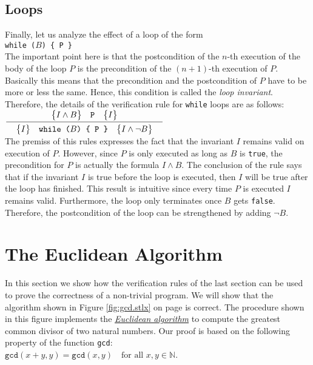 \subsection{Loops}
Finally, let us analyze the effect of a loop of the form
\\[0.2cm]
\hspace*{1.3cm}
\texttt{while ($B$) \{ P \}} 
\\[0.2cm]
The important point here is that the postcondition of the $n$-th
execution of the body of the loop $P$ is the precondition of the $(n\!+\!1)$-th
execution of $P$.  Basically this means that the precondition and the
postcondition of $P$ have to be more or less the same.
Hence, this condition is called the \emph{loop invariant}.  Therefore,
the details of the verification rule for \texttt{while} loops are as follows:
\\[0.2cm]
\hspace*{1.3cm}
$\bruch{\hoare{I \wedge B}{P}{I}}{\quad \hoare{I}{while ($B$) \{ P \}}{I \wedge \neg B}\quad}$
\\[0.2cm]
The premiss of this rules expresses the fact that the invariant $I$ remains valid on execution of $P$.
However, since $P$ is only executed as long as $B$ is \texttt{true}, the precondition for $P$ is actually 
the formula $I \wedge B$.  The conclusion of the rule says that if the invariant $I$ is true before
the loop is executed, then $I$ will be true after the loop has finished.  This result is intuitive
since every time $P$ is executed $I$ remains valid.  Furthermore, the loop only terminates once $B$
gets \texttt{false}.  Therefore, the postcondition of the loop can be strengthened by adding $\neg B$.



\section{The Euclidean  Algorithm}
In this section we show how the verification rules of the last section can be used to prove the
correctness of a non-trivial program.
We will show that the algorithm shown in Figure \ref{fig:gcd.stlx} on page \pageref{fig:gcd.stlx} is correct.
The procedure shown in this figure implements the
\href{http://en.wikipedia.org/wiki/Euclidean_algorithm}{\emph{Euclidean algorithm}}
to compute the greatest common divisor of two natural numbers.  Our proof is based on the following
property of the function \texttt{gcd}:
\\[0.2cm]
\hspace*{1.3cm}
$\texttt{gcd}(x + y, y) = \texttt{gcd}(x,y) \quad \mbox{for all $x, y \in \mathbb{N}$}$.


